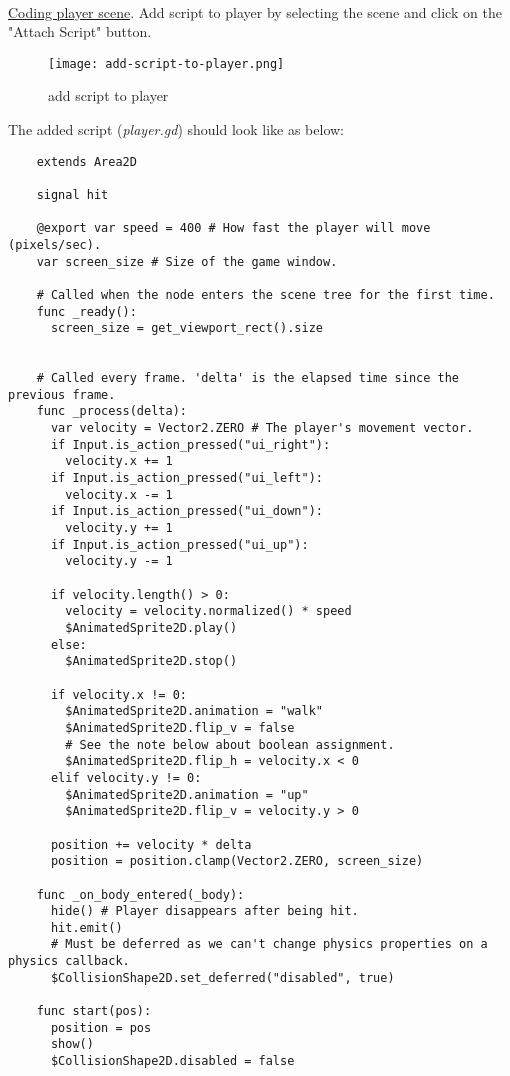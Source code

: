   \paragraph{}
  \href{https://docs.godotengine.org/en/stable/getting_started/first_2d_game/03.coding_the_player.html}{\color{blue}Coding player scene}. 
  Add script to player by selecting the scene and click on the "Attach Script" button.
  \begin{figure}[H]
    \centering
    \texttt{[image: add-script-to-player.png]}
    \caption{add script to player}
    \label{fig:add-script-to-player}
  \end{figure}
  The added script (\textit{player.gd}) should look like as below:
  \begin{verbatim}
    extends Area2D

    signal hit

    @export var speed = 400 # How fast the player will move (pixels/sec).
    var screen_size # Size of the game window.
    
    # Called when the node enters the scene tree for the first time.
    func _ready():
      screen_size = get_viewport_rect().size
    
    
    # Called every frame. 'delta' is the elapsed time since the previous frame.
    func _process(delta):
      var velocity = Vector2.ZERO # The player's movement vector.
      if Input.is_action_pressed("ui_right"):
        velocity.x += 1
      if Input.is_action_pressed("ui_left"):
        velocity.x -= 1
      if Input.is_action_pressed("ui_down"):
        velocity.y += 1
      if Input.is_action_pressed("ui_up"):
        velocity.y -= 1
    
      if velocity.length() > 0:
        velocity = velocity.normalized() * speed
        $AnimatedSprite2D.play()
      else:
        $AnimatedSprite2D.stop()
      
      if velocity.x != 0:
        $AnimatedSprite2D.animation = "walk"
        $AnimatedSprite2D.flip_v = false
        # See the note below about boolean assignment.
        $AnimatedSprite2D.flip_h = velocity.x < 0
      elif velocity.y != 0:
        $AnimatedSprite2D.animation = "up"
        $AnimatedSprite2D.flip_v = velocity.y > 0
      
      position += velocity * delta
      position = position.clamp(Vector2.ZERO, screen_size)  
      
    func _on_body_entered(_body):
      hide() # Player disappears after being hit.
      hit.emit()
      # Must be deferred as we can't change physics properties on a physics callback.
      $CollisionShape2D.set_deferred("disabled", true)
      
    func start(pos):
      position = pos
      show()
      $CollisionShape2D.disabled = false
  \end{verbatim} 
